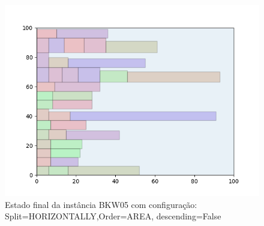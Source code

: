 \begin{figure}[H]
    \centering
    \caption[]{Estado final da instância BKW05 com configuração: Split=HORIZONTALLY,Order=AREA, descending=False}
    \label{fig:bkw05-horizontally-area-false}
    \includegraphics[scale=0.5]{output/figures/bkw/bkw05/horizontally/area/false/00}
\end{figure}